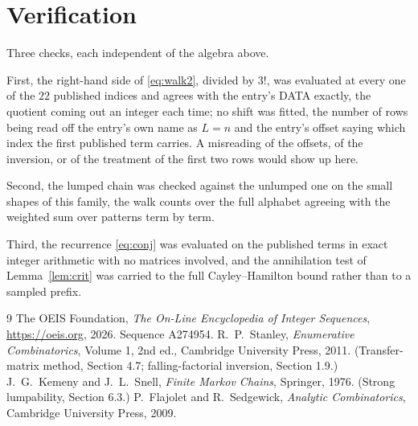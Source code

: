 \documentclass[11pt,a4paper]{article}
\theoremstyle{plain}
\theoremstyle{definition}
\begin{document}
\section{Verification}

Three checks, each independent of the algebra above.

First, the right-hand side of \eqref{eq:walk2}, divided by $3!$, was evaluated at every
one of the $22$ published indices and agrees with the entry's DATA exactly, the quotient
coming out an integer each time; no shift was fitted, the number of rows being read off the
entry's own name as $L=n$ and the entry's offset saying which index the first published
term carries. A misreading of the offsets, of the inversion, or of the treatment of the first
two rows would show up here.

Second, the lumped chain was checked against the unlumped one on the small shapes of this
family, the walk counts over the full alphabet agreeing with the weighted sum over patterns
term by term.

Third, the recurrence \eqref{eq:conj} was evaluated on the published terms in exact integer
arithmetic with no matrices involved, and the annihilation test of Lemma~\ref{lem:crit} was
carried to the full Cayley--Hamilton bound rather than to a sampled prefix.

\begin{thebibliography}{9}
 The OEIS Foundation, \emph{The On-Line Encyclopedia of Integer
Sequences}, \url{https://oeis.org}, 2026. Sequence A274954.
 R.~P.~Stanley, \emph{Enumerative Combinatorics}, Volume 1, 2nd ed.,
Cambridge University Press, 2011. (Transfer-matrix method, Section 4.7; falling-factorial
inversion, Section 1.9.)
 J.~G.~Kemeny and J.~L.~Snell, \emph{Finite Markov Chains}, Springer,
1976. (Strong lumpability, Section 6.3.)
 P.~Flajolet and R.~Sedgewick, \emph{Analytic Combinatorics}, Cambridge
University Press, 2009.
\end{thebibliography}
\end{document}
